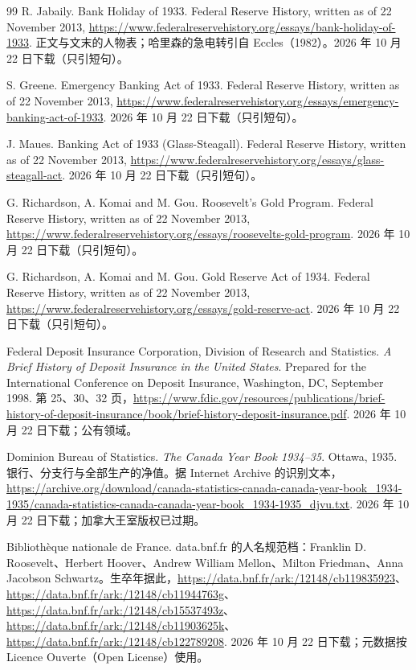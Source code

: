\begin{thebibliography}{99}
 R. Jabaily. Bank Holiday of 1933. Federal Reserve History, written as of 22 November 2013, \url{https://www.federalreservehistory.org/essays/bank-holiday-of-1933}. 正文与文末的人物表；哈里森的急电转引自 Eccles（1982）。2026 年 10 月 22 日下载（只引短句）。

 S. Greene. Emergency Banking Act of 1933. Federal Reserve History, written as of 22 November 2013, \url{https://www.federalreservehistory.org/essays/emergency-banking-act-of-1933}. 2026 年 10 月 22 日下载（只引短句）。

 J. Maues. Banking Act of 1933 (Glass-Steagall). Federal Reserve History, written as of 22 November 2013, \url{https://www.federalreservehistory.org/essays/glass-steagall-act}. 2026 年 10 月 22 日下载（只引短句）。

 G. Richardson, A. Komai and M. Gou. Roosevelt's Gold Program. Federal Reserve History, written as of 22 November 2013, \url{https://www.federalreservehistory.org/essays/roosevelts-gold-program}. 2026 年 10 月 22 日下载（只引短句）。

 G. Richardson, A. Komai and M. Gou. Gold Reserve Act of 1934. Federal Reserve History, written as of 22 November 2013, \url{https://www.federalreservehistory.org/essays/gold-reserve-act}. 2026 年 10 月 22 日下载（只引短句）。

 Federal Deposit Insurance Corporation, Division of Research and Statistics. \emph{A Brief History of Deposit Insurance in the United States}. Prepared for the International Conference on Deposit Insurance, Washington, DC, September 1998. 第 25、30、32 页，\url{https://www.fdic.gov/resources/publications/brief-history-of-deposit-insurance/book/brief-history-deposit-insurance.pdf}. 2026 年 10 月 22 日下载；公有领域。

 Dominion Bureau of Statistics. \emph{The Canada Year Book 1934--35}. Ottawa, 1935. 银行、分支行与全部生产的净值。据 Internet Archive 的识别文本，\url{https://archive.org/download/canada-statistics-canada-canada-year-book_1934-1935/canada-statistics-canada-canada-year-book_1934-1935_djvu.txt}. 2026 年 10 月 22 日下载；加拿大王室版权已过期。

 Bibliothèque nationale de France. data.bnf.fr 的人名规范档：Franklin D. Roosevelt、Herbert Hoover、Andrew William Mellon、Milton Friedman、Anna Jacobson Schwartz。生卒年据此，\url{https://data.bnf.fr/ark:/12148/cb119835923}、\url{https://data.bnf.fr/ark:/12148/cb11944763g}、\url{https://data.bnf.fr/ark:/12148/cb15537493z}、\url{https://data.bnf.fr/ark:/12148/cb11903625k}、\url{https://data.bnf.fr/ark:/12148/cb122789208}. 2026 年 10 月 22 日下载；元数据按 Licence Ouverte（Open License）使用。


\end{thebibliography}
